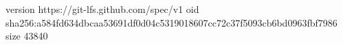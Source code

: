 version https://git-lfs.github.com/spec/v1
oid sha256:a584fd634dbcaa53691df0d04c5319018607cc72c37f5093cb6bd0963fbf7986
size 43840
